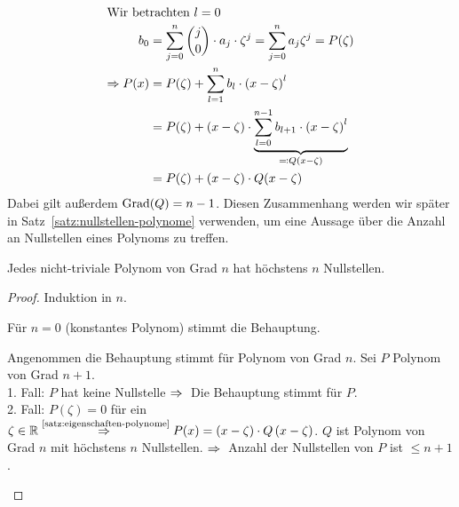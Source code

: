 \begin{satz}
\begin{enumerate}[label=(\roman*)]
\begin{align*}
            \intertext{Wir betrachten $l=0$}
            b_0 &= \sum_{j=0}^{n} \binom{j}{0}\cdot a_j\cdot\zeta^{j} = \sum_{j=0}^{n} a_j \zeta^j = P(\zeta)\\
            \Rightarrow{} P(x) &= P(\zeta) + \sum_{l=1}^{n} b_l \cdot\left(x-\zeta\right)^l\\
            &= P(\zeta) + (x-\zeta) \cdot \underbrace{\sum_{l=0}^{n-1} b_{l+1} \cdot \left(x-\zeta\right)^l}_{\eqqcolon Q(x-\zeta)}\\
            &= P(\zeta) + (x-\zeta)\cdot Q(x-\zeta)
        \end{align*}
        Dabei gilt außerdem $\operatorname{Grad}(Q) = n-1$. Diesen Zusammenhang werden wir später in Satz~\ref{satz:nullstellen-polynome} verwenden, um eine Aussage über die Anzahl an Nullstellen eines Polynoms zu treffen.
    \end{enumerate}
\end{satz}


\begin{satz}
    \marginnote{[9. Jan]}
    \label{satz:nullstellen-polynome}
    Jedes nicht-triviale Polynom von Grad $n$ hat höchstens $n$ Nullstellen.

    \begin{proof}
        Induktion in $n$.~\\
        \begin{induktionsanfang}
            Für $n=0$ (konstantes Polynom) stimmt die Behauptung.
        \end{induktionsanfang}
        \begin{induktionsschritt}
            Angenommen die Behauptung stimmt für Polynom von Grad $n$. Sei $P$ Polynom von Grad $n+1$.\\
            1. Fall: $P$ hat keine Nullstelle $\Rightarrow{}$ Die Behauptung stimmt für $P$.\\
            2. Fall: $P(\zeta) = 0$ für ein $\zeta\in\mathbb{R} \overset{\text{\ref{satz:eigenschaften-polynome}}}{\Rightarrow{}} P(x) = (x-\zeta)\cdot Q\left(x-\zeta\right)$. $Q$ ist Polynom von Grad $n$ mit höchstens $n$ Nullstellen. $\Rightarrow{}$ Anzahl der Nullstellen von $P$ ist $\leq n+1$.\qedhere
        \end{induktionsschritt}
    \end{proof}
\end{satz}

